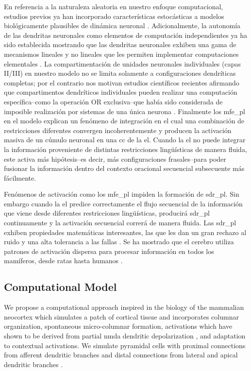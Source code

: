 {En referencia a la naturaleza aleatoria en nuestro enfoque computacional, estudios previos ya han incorporado características estocásticas a modelos biológicamente plausibles de dinámica neuronal \cite{harrison_l.m_stochastic_2005}.
Adicionalmente, la autonomía de las dendritas neuronales como elementos de computación independientes ya ha sido establecida mostrando que las dendritas neuronales exhiben una gama de mecanismos lineales y no lineales que les permiten implementar computaciones elementales \cite{poirazi_dendritic_2015, PAYEUR201978}.
La compartimentación de unidades neuronales individuales (capas II/III) en nuestro modelo no se limita solamente a configuraciones dendríticas completas; por el contrario nos motivan estudios científicos recientes afirmando que compartimentos dendríticos individuales pueden realizar una computación específica--como la operación OR exclusiva--que había sido considerada de imposible realización por sistemas de una única neurona \cite{Gidon83}.
Finalmente los \gls{mfe_pl} en el modelo explican un fenómeno de integración en el cual una combinación de restricciones diferentes convergen incoherentemente y producen la activación masiva de un cúmulo neuronal en una \gls{cc} de la \gls{el}.
Cuando la \gls{el} no puede integrar la información proveniente de distintas restricciones lingüísticas de manera fluida, este activa más hipótesis--es decir, más configuraciones frasales--para poder fusionar la información dentro del contexto oracional secuencial subsecuente más fácilmente. 

Fenómenos de activación como los \gls{mfe_pl} impiden la formación de \gls{sdr_pl}. Sin embargo cuando la \gls{el} predice correctamente el flujo secuencial de la información que viene desde diferentes restricciones lingüísticas, producirá \gls{sdr_pl} continuamente y la activación secuencial correrá de manera fluida.
Las \gls{sdr_pl} exhiben propiedades matemáticas interesantes, las que les dan un gran rechazo al ruido y una alta tolerancia a las fallas \cite{DBLP:journals/corr/AhmadH15}.
Se ha mostrado que el cerebro utiliza patrones de activación dispersa para procesar información en todos los mamíferos, desde ratas hasta humanos \cite{barth_experimental_2012}.
}{
\subsection{Computational Model}

We propose a computational approach inspired in the biology of the mammalian neocortex which simulates a patch of cortical tissue and incorporates columnar organization, spontaneous micro-columnar formation,  activations which have shown to be derived from partial \gls{nmda} dendritic depolarization \cite{Antic2010TheDO,Major2013ActivePO,10.3389/fncir.2016.00023}, and adaptation to contextual activations. We simulate pyramidal cells with proximal connections from afferent dendritic branches and distal connections from lateral and apical dendritic branches \cite{10.1371/journal.pone.0217966}.

}
